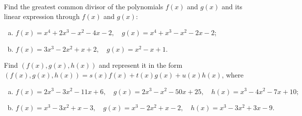 \begin{problem}
Find the greatest common divisor of the polynomials $f(x)$ and $g(x)$ and its linear expression through $f(x)$ and $g(x)$:
\begin{enumerate}[a) ]
\item $f(x)=x^4+2 x^3-x^2-4 x-2, \quad g(x)=x^4+x^3-x^2-2 x-2$;
\item $f(x)=3 x^3-2 x^2+x+2, \quad g(x)=x^2-x+1$.
\end{enumerate}
\end{problem}

\begin{problem}
Find $(f(x), g(x), h(x))$ and represent it in the form $(f(x), g(x), h(x)) = s(x)f(x) + t(x)g(x) + u(x)h(x)$, where
\begin{enumerate}[a) ]
\item $f(x) = 2x^3 - 3x^2 - 11x + 6, \quad g(x) =2x^3 - x^2 - 50x +25, \quad h(x) = x^3 - 4x^2 - 7x +10;$
\item $f(x) = x^3 - 3 x^2 + x - 3, \quad g(x) = x^3 - 2 x^2 + x - 2, \quad h(x) = x^3 - 3 x^2 + 3 x - 9.$
\end{enumerate}
\end{problem}